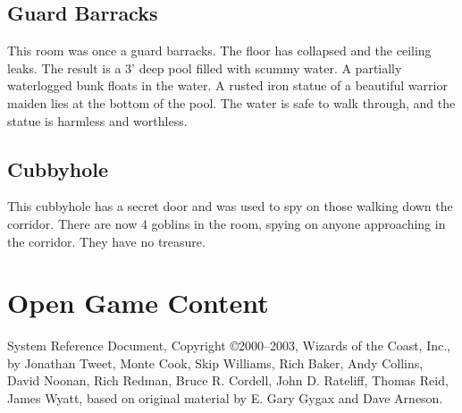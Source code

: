 \documentclass[letterpaper,serif]{rpg-module}
\begin{document}

\subsection{Guard Barracks}

This room was once a guard barracks. The floor has collapsed and the ceiling leaks.
The result is a 3' deep pool filled with scummy water. A partially waterlogged bunk
floats in the water. A rusted iron statue of a beautiful warrior maiden lies at the
bottom of the pool. The water is safe to walk through, and the statue is harmless
and worthless.

\subsection{Cubbyhole}

This cubbyhole has a secret door and was used to spy on those walking down the
corridor. There are now 4 goblins in the room, spying on anyone approaching in the
corridor. They have no treasure.



\vspace{10ex}


\tableofcontents


\section{Open Game Content}
\label{ogl}

\begin{ogl}
\item System Reference Document, Copyright \copyright 2000--2003, Wizards of the Coast, Inc., by Jonathan Tweet, Monte Cook,
Skip Williams, Rich Baker, Andy Collins, David Noonan, Rich Redman, Bruce R. Cordell, John D. Rateliff, Thomas Reid, James
Wyatt, based on original material by E. Gary Gygax and Dave Arneson.
\end{ogl}
\end{document}
